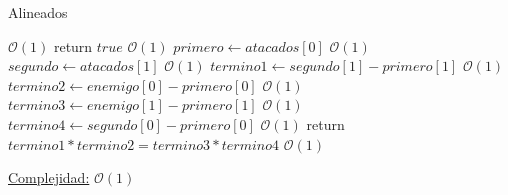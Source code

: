 \begin{algorithm}
\caption{Alineados}
\begin{algorithmic}
  	 \Comment $\mathcal{O}(1)$
  		\State return $true$ \Comment $\mathcal{O}(1)$
  	\Else
  		\State $primero \gets atacados[0]$ \Comment $\mathcal{O}(1)$
  		\State $segundo \gets atacados[1]$ \Comment $\mathcal{O}(1)$
  		\State $termino1 \gets segundo[1] - primero[1]$ \Comment $\mathcal{O}(1)$
  		\State $termino2 \gets enemigo[0] - primero[0]$ \Comment $\mathcal{O}(1)$
    		\State $termino3 \gets enemigo[1] - primero[1]$ \Comment $\mathcal{O}(1)$
      	\State $termino4 \gets segundo[0] - primero[0]$ \Comment $\mathcal{O}(1)$
      	\State return $termino1*termino2 = termino3*termino4$ \Comment $\mathcal{O}(1)$ 
  	\EndIf
\EndFunction
\end{algorithmic}
\underline{Complejidad:} $\mathcal{O}(1)$\\
\end{algorithm}


